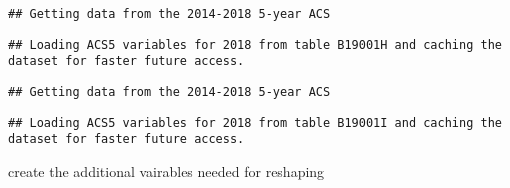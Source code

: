 \documentclass[]{article}
\newenvironment{Shaded}{\begin{snugshade}}{\end{snugshade}}
\newcommand{\DataTypeTok}[1]{\textcolor[rgb]{0.13,0.29,0.53}{#1}}
\newcommand{\DecValTok}[1]{\textcolor[rgb]{0.00,0.00,0.81}{#1}}
\newcommand{\KeywordTok}[1]{\textcolor[rgb]{0.13,0.29,0.53}{\textbf{#1}}}
\newcommand{\NormalTok}[1]{#1}
\newcommand{\OperatorTok}[1]{\textcolor[rgb]{0.81,0.36,0.00}{\textbf{#1}}}
\newcommand{\OtherTok}[1]{\textcolor[rgb]{0.56,0.35,0.01}{#1}}
\newcommand{\StringTok}[1]{\textcolor[rgb]{0.31,0.60,0.02}{#1}}
\begin{document}
\begin{verbatim}
## Getting data from the 2014-2018 5-year ACS
\end{verbatim}

\begin{verbatim}
## Loading ACS5 variables for 2018 from table B19001H and caching the dataset for faster future access.
\end{verbatim}

\begin{Shaded}
\end{Shaded}

\begin{verbatim}
## Getting data from the 2014-2018 5-year ACS
\end{verbatim}

\begin{verbatim}
## Loading ACS5 variables for 2018 from table B19001I and caching the dataset for faster future access.
\end{verbatim}

create the additional vairables needed for reshaping
\end{document}
